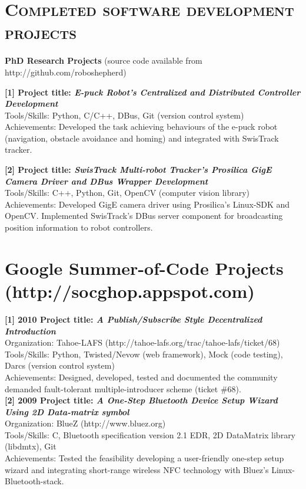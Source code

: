 \documentclass[notopicbreak,contbibnum,plain]{simplecv}
\begin{document}
\section{\textsc{Completed software development projects}}
\vspace*{-0.2cm}
\textbf{PhD Research Projects} (source code available from http://github.com/roboshepherd)
\begin{topic}
\vspace*{-0.2cm}
\item \textbf{[1] Project title: \textit{E-puck Robot's Centralized and Distributed Controller Development}}\\
Tools/Skills: Python, C/C++, DBus, Git (version control system)\\
Achievements: Developed the task achieving behaviours of the e-puck robot (navigation, obstacle avoidance and homing) and integrated with SwisTrack tracker.
\vspace*{-0.2cm}
\item \textbf{[2] Project title: \textit{SwisTrack Multi-robot Tracker's Prosilica GigE Camera Driver and DBus Wrapper Development}}\\
Tools/Skills: C++, Python, Git, OpenCV (computer vision library)\\
Achievements: Developed GigE camera driver using Prosilica's Linux-SDK and OpenCV. Implemented SwisTrack's DBus server component for broadcasting position information to robot controllers.
\vspace*{-0.3cm}
\end{topic}
\section{\textbf{Google Summer-of-Code Projects} (http://socghop.appspot.com)}
\vspace*{-0.3cm}
\textbf{[1] 2010 Project title: \textit{A Publish/Subscribe Style Decentralized Introduction}}\\
Organization: Tahoe-LAFS (http://tahoe-lafs.org/trac/tahoe-lafs/ticket/68)\\
Tools/Skills: Python, Twisted/Nevow (web framework), Mock (code testing), Darcs (version control system)\\
Achievements: Designed, developed, tested and documented the community demanded fault-tolerant multiple-introducer scheme (ticket \#68).\\
\textbf{[2] 2009 Project title: \textit{A One-Step Bluetooth Device Setup Wizard Using 2D Data-matrix symbol}}\\
Organization: BlueZ (http://www.bluez.org) \\
Tools/Skills: C, Bluetooth specification version 2.1 EDR, 2D DataMatrix library (libdmtx), Git\\
Achievements: Tested the feasibility developing a user-friendly one-step setup wizard and integrating short-range wireless NFC technology with Bluez's Linux-Bluetooth-stack.
\vspace*{-0.3cm}
\end{document}
